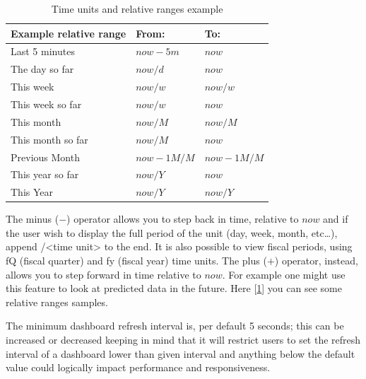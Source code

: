\begin{table}[!ht]
    \centering
    \begin{tabular}{|l|l|l|}
        \toprule
        Example relative range & From:      & To:        \\ \midrule
        Last 5 minutes         & $now-5m$   & $now$      \\ \hline
        The day so far         & $now/d$    & $now$      \\ \hline
        This week              & $now/w$    & $now/w$    \\ \hline
        This week so far       & $now/w$    & $now$      \\ \hline
        This month             & $now/M$    & $now/M$    \\ \hline
        This month so far      & $now/M$    & $now$      \\ \hline
        Previous Month         & $now-1M/M$ & $now-1M/M$ \\ \hline
        This year so far       & $now/Y$    & $now$      \\ \hline
        This Year              & $now/Y$    & $now/Y$    \\ \bottomrule
    \end{tabular}
    \caption{Time units and relative ranges example}
    \label{table:time_picker}
\end{table}
The minus ($-$) operator allows you to step back in time, relative to $now$ and if the user wish to display the full period of the unit (day, week, month, etc…),
append /<time unit> to the end. It is also possible to view fiscal periods, using fQ (fiscal quarter) and fy (fiscal year) time units.
The plus ($+$) operator, instead, allows you to step forward in time relative to $now$. For example one might use this feature to look at predicted data in the future.
Here [\ref{table:time_picker}] you can see some relative ranges samples.

The minimum dashboard refresh interval is, per default 5 seconds; this can be increased or decreased keeping in mind that
it will restrict users to set the refresh interval of a dashboard lower than given interval and anything below the default value could logically impact performance and responsiveness.

